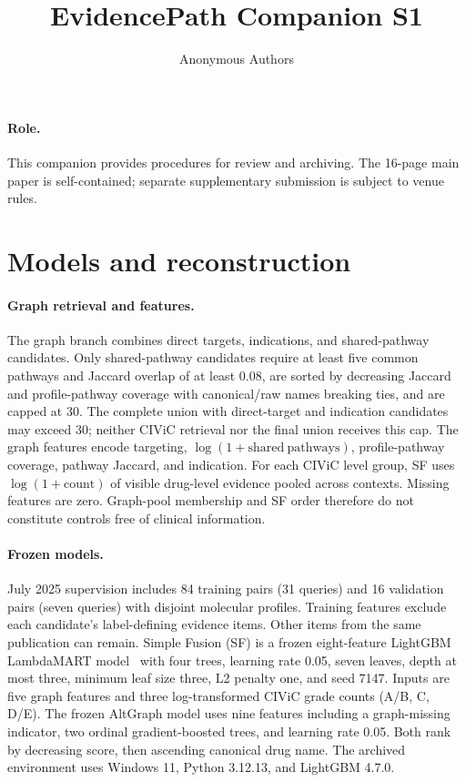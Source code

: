 \documentclass[runningheads]{llncs}
\begin{document}
\title{EvidencePath Companion S1}
\author{Anonymous Authors}
\institute{}
\maketitle

\paragraph{Role.} This companion provides procedures for review and archiving. The 16-page main paper is self-contained; separate supplementary submission is subject to venue rules.

\section{Models and reconstruction}

\paragraph{Graph retrieval and features.}
The graph branch combines direct targets, indications, and shared-pathway candidates. Only shared-pathway candidates require at least five common pathways and Jaccard overlap of at least \(0.08\), are sorted by decreasing Jaccard and profile-pathway coverage with canonical/raw names breaking ties, and are capped at 30. The complete union with direct-target and indication candidates may exceed 30; neither CIViC retrieval nor the final union receives this cap. The graph features encode targeting, \(\log(1+\mathrm{shared\ pathways})\), profile-pathway coverage, pathway Jaccard, and indication. For each CIViC level group, SF uses \(\log(1+\mathrm{count})\) of visible drug-level evidence pooled across contexts. Missing features are zero. Graph-pool membership and SF order therefore do not constitute controls free of clinical information.

\paragraph{Frozen models.}
July 2025 supervision includes 84 training pairs (31 queries) and 16 validation pairs (seven queries) with disjoint molecular profiles. Training features exclude each candidate's label-defining evidence items. Other items from the same publication can remain. Simple Fusion (SF) is a frozen eight-feature LightGBM LambdaMART model~\cite{lightgbm} with four trees, learning rate 0.05, seven leaves, depth at most three, minimum leaf size three, L2 penalty one, and seed 7147. Inputs are five graph features and three log-transformed CIViC grade counts (A/B, C, D/E). The frozen AltGraph model uses nine features including a graph-missing indicator, two ordinal gradient-boosted trees, and learning rate 0.05. Both rank by decreasing score, then ascending canonical drug name. The archived environment uses Windows 11, Python 3.12.13, and LightGBM 4.7.0.
\end{document}
